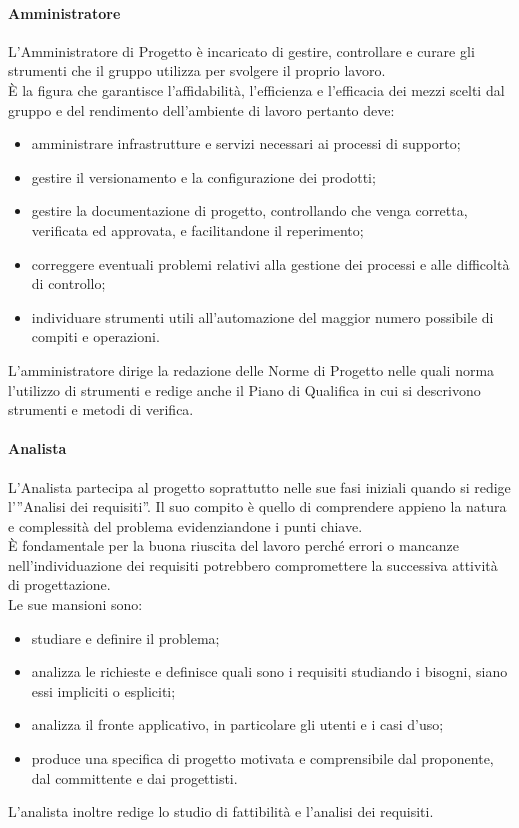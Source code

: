 			\paragraph{Amministratore }
				L’Amministratore di Progetto è incaricato di gestire, controllare e curare gli strumenti che il gruppo utilizza per svolgere il proprio lavoro. \\
				È la figura che garantisce l’affidabilità, l’efficienza e l’efficacia dei mezzi scelti dal gruppo e del rendimento dell’ambiente di lavoro pertanto deve:\\
				\begin{itemize}
					\item amministrare infrastrutture e servizi necessari ai processi di supporto;
					\item gestire il versionamento e la configurazione dei prodotti;
					\item gestire la documentazione di progetto, controllando che venga corretta, verificata ed approvata, e facilitandone il reperimento;
					\item correggere eventuali problemi relativi alla gestione dei processi e alle difficoltà di controllo;
					\item individuare strumenti utili all’automazione del maggior numero possibile di compiti e operazioni.
				\end{itemize}
				L’amministratore dirige la redazione delle Norme di Progetto nelle quali norma l’utilizzo di strumenti e redige anche il Piano di Qualifica in cui si descrivono strumenti e metodi di verifica.
			\paragraph{Analista}
				L’Analista partecipa al progetto soprattutto nelle sue fasi iniziali quando si redige l’”Analisi dei requisiti”. Il suo compito è quello di comprendere appieno la natura e complessità del problema evidenziandone i punti chiave. \\
				È fondamentale per la buona riuscita del lavoro perché errori o mancanze nell’individuazione dei requisiti potrebbero compromettere la successiva attività di progettazione.\\
				Le sue mansioni sono:\\
				\begin{itemize}
					\item studiare e definire il problema;
					\item analizza le richieste e definisce quali sono i requisiti studiando i bisogni, siano essi impliciti o espliciti;
					\item analizza il fronte applicativo, in particolare gli utenti e i casi d’uso;
					\item produce una specifica di progetto motivata e comprensibile dal proponente, dal committente e dai progettisti.
				\end{itemize}
				L’analista inoltre redige lo studio di fattibilità e l’analisi dei requisiti.
